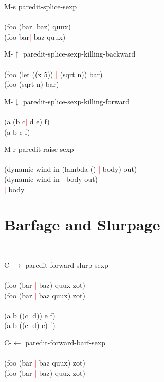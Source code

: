 \documentclass[8pt,a4paper,landscape]{extarticle}
\newcommand{\csr}{\textcolor{red}{| }}
\begin{document}
\begin{multicols}{4}
\begin{eqlist}
\item[M-s] paredit-splice-sexp\\
  \\
  (foo (bar\csr  baz) quux)\\
  (foo bar\csr  baz quux)\\


\item[M-$\uparrow$] paredit-splice-sexp-killing-backward\\
  \\
  (foo (let ((x 5)) \csr (sqrt n)) bar)\\
  (foo (sqrt n) bar)\\


\item[M-$\downarrow$] paredit-splice-sexp-killing-forward\\
  \\
  (a (b c\csr  d e) f)\\
  (a b c f)\\


\item[M-r] paredit-raise-sexp\\
  \\
  (dynamic-wind in (lambda () \csr body) out)\\
  (dynamic-wind in \csr body out)\\
  \csr body\\
\end{eqlist}

\section{Barfage and Slurpage}
\begin{eqlist}
  \tt
\item[C-$\rightarrow$] paredit-forward-slurp-sexp\\
  \\
  (foo (bar \csr baz) quux zot)\\
  (foo (bar \csr baz quux) zot)\\
  \\
  (a b ((c\csr  d)) e f)\\
  (a b ((c\csr  d) e) f)\\


\item[C-$\leftarrow$] paredit-forward-barf-sexp\\
  \\
  (foo (bar \csr baz quux) zot)\\
  (foo (bar \csr baz) quux zot)\\



\end{eqlist}
\end{multicols}
\end{document}
